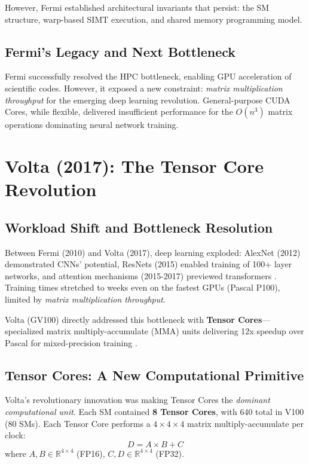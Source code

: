 \documentclass{article}
\begin{document}
However, Fermi established architectural invariants that persist: the SM structure, warp-based SIMT execution, and shared memory programming model.

\subsection{Fermi's Legacy and Next Bottleneck}

Fermi successfully resolved the HPC bottleneck, enabling GPU acceleration of scientific codes. However, it exposed a new constraint: \textit{matrix multiplication throughput} for the emerging deep learning revolution. General-purpose CUDA Cores, while flexible, delivered insufficient performance for the $O(n^3)$ matrix operations dominating neural network training.

\section{Volta (2017): The Tensor Core Revolution}

\subsection{Workload Shift and Bottleneck Resolution}

Between Fermi (2010) and Volta (2017), deep learning exploded: AlexNet (2012) demonstrated CNNs' potential, ResNets (2015) enabled training of 100+ layer networks, and attention mechanisms (2015-2017) previewed transformers \cite{bahdanau2014neural}. Training times stretched to weeks even on the fastest GPUs (Pascal P100), limited by \textit{matrix multiplication throughput}.

Volta (GV100) directly addressed this bottleneck with \textbf{Tensor Cores}—specialized matrix multiply-accumulate (MMA) units delivering 12x speedup over Pascal for mixed-precision training \cite{nvidia2017volta}.

\subsection{Tensor Cores: A New Computational Primitive}

Volta's revolutionary innovation was making Tensor Cores the \textit{dominant computational unit}. Each SM contained \textbf{8 Tensor Cores}, with 640 total in V100 (80 SMs). Each Tensor Core performs a $4 \times 4 \times 4$ matrix multiply-accumulate per clock:
\begin{equation}
D = A \times B + C
\end{equation}
where $A, B \in \mathbb{R}^{4 \times 4}$ (FP16), $C, D \in \mathbb{R}^{4 \times 4}$ (FP32).
\end{document}
